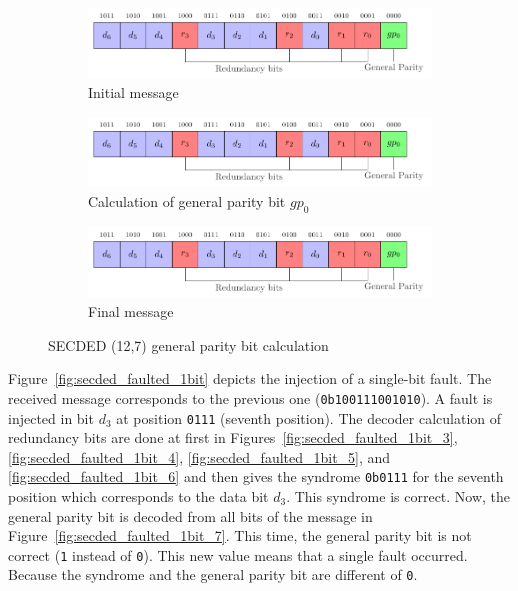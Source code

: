 \begin{figure}[ht]
    \centering
    \begin{subfigure}[b]{0.49\textwidth}
        \includegraphics[width=\textwidth, page=2]{c5_countermeasures_dift/img/secded.pdf}
        \caption{Initial message}
        \label{fig:secded_example_1}
    \end{subfigure}
    \hfill
    \begin{subfigure}[b]{0.49\textwidth}
        \includegraphics[width=\textwidth, page=4]{c5_countermeasures_dift/img/secded.pdf}
        \caption{Calculation of general parity bit $gp_0$}
        \label{fig:secded_example_2}
    \end{subfigure}
    \hfill
    \begin{subfigure}[b]{0.49\textwidth}
        \includegraphics[width=\textwidth, page=5]{c5_countermeasures_dift/img/secded.pdf}
        \caption{Final message}
        \label{fig:secded_example_3}
    \end{subfigure}
    \caption{SECDED (12,7) general parity bit calculation}
    \label{fig:secded_example}
\end{figure}

Figure~\ref{fig:secded_faulted_1bit} depicts the injection of a single-bit fault. The received message corresponds to the previous one (\texttt{0b100111001010}). A fault is injected in bit $d_3$ at position \texttt{0111} (seventh position).
The decoder calculation of redundancy bits are done at first in Figures~\ref{fig:secded_faulted_1bit_3}, \ref{fig:secded_faulted_1bit_4}, \ref{fig:secded_faulted_1bit_5}, and \ref{fig:secded_faulted_1bit_6} and then gives the syndrome \texttt{0b0111} for the seventh position which corresponds to the data bit $d_3$. This syndrome is correct. Now, the general parity bit is decoded from all bits of the message in Figure~\ref{fig:secded_faulted_1bit_7}. This time, the general parity bit is not correct (\texttt{1} instead of \texttt{0}). This new value means that a single fault occurred. Because the syndrome and the general parity bit are different of \texttt{0}.


